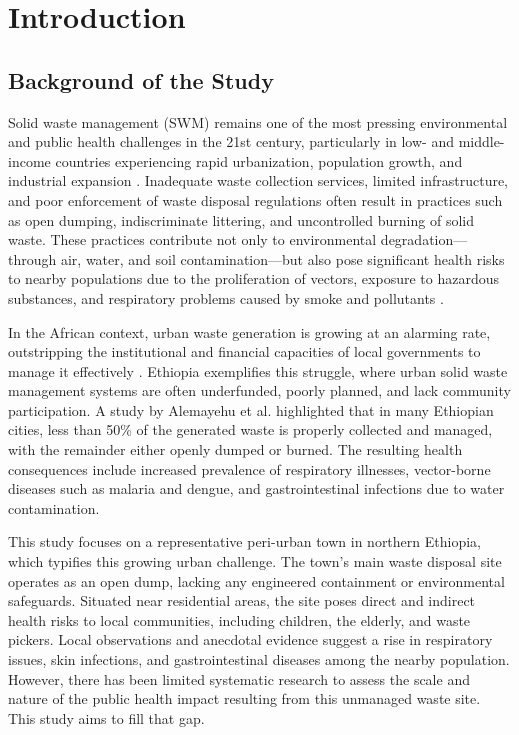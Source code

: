 
\chapter{Introduction}
\label{chap:introduction}

\section{Background of the Study}
\label{sec:background}
Solid waste management (SWM) remains one of the most pressing environmental and public health challenges in the 21st century, particularly in low- and middle-income countries experiencing rapid urbanization, population growth, and industrial expansion \cite{Kaza2018, Wilson2015}. Inadequate waste collection services, limited infrastructure, and poor enforcement of waste disposal regulations often result in practices such as open dumping, indiscriminate littering, and uncontrolled burning of solid waste. These practices contribute not only to environmental degradation—through air, water, and soil contamination—but also pose significant health risks to nearby populations due to the proliferation of vectors, exposure to hazardous substances, and respiratory problems caused by smoke and pollutants \cite{UNEP2015, Ferronato2019}.

In the African context, urban waste generation is growing at an alarming rate, outstripping the institutional and financial capacities of local governments to manage it effectively \cite{Hoornweg2012}. Ethiopia exemplifies this struggle, where urban solid waste management systems are often underfunded, poorly planned, and lack community participation. A study by Alemayehu et al. \cite{Alemayehu2021} highlighted that in many Ethiopian cities, less than 50\% of the generated waste is properly collected and managed, with the remainder either openly dumped or burned. The resulting health consequences include increased prevalence of respiratory illnesses, vector-borne diseases such as malaria and dengue, and gastrointestinal infections due to water contamination.

This study focuses on a representative peri-urban town in northern Ethiopia, which typifies this growing urban challenge. The town’s main waste disposal site operates as an open dump, lacking any engineered containment or environmental safeguards. Situated near residential areas, the site poses direct and indirect health risks to local communities, including children, the elderly, and waste pickers. Local observations and anecdotal evidence suggest a rise in respiratory issues, skin infections, and gastrointestinal diseases among the nearby population. However, there has been limited systematic research to assess the scale and nature of the public health impact resulting from this unmanaged waste site. This study aims to fill that gap.

